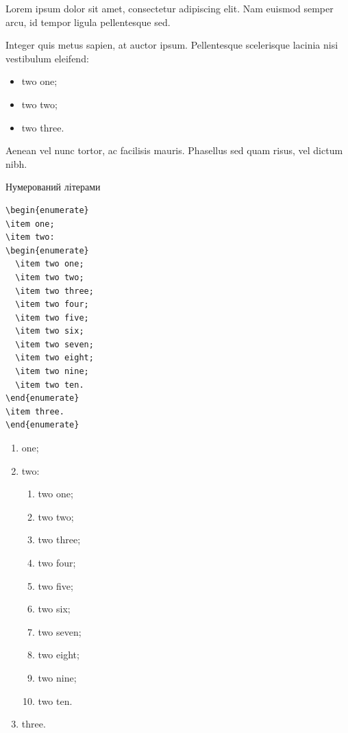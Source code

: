 \begin{longEnumerate}
\item Lorem ipsum dolor sit amet, consectetur adipiscing elit. Nam euismod semper arcu, id tempor ligula pellentesque sed. 
\item Integer quis metus sapien, at auctor ipsum. Pellentesque scelerisque
lacinia nisi vestibulum eleifend:
\begin{itemize}
  \item two one;
  \item two two;
  \item two three.
\end{itemize}
\item Aenean vel nunc tortor, ac facilisis mauris. Phasellus sed quam risus, vel dictum nibh.
\end{longEnumerate}

Нумерований літерами

\begin{framed}\small
\begin{lstlisting}
\begin{enumerate}
\item one;
\item two:
\begin{enumerate}
  \item two one;
  \item two two;
  \item two three;
  \item two four;
  \item two five;
  \item two six;
  \item two seven;
  \item two eight;
  \item two nine;
  \item two ten.
\end{enumerate}
\item three.
\end{enumerate}
\end{lstlisting}
\end{framed}

\begin{enumerate}
\item one;
\item two:
\begin{enumerate}
  \item two one;
  \item two two;
  \item two three;
  \item two four;
  \item two five;
  \item two six;
  \item two seven;
  \item two eight;
  \item two nine;
  \item two ten.
\end{enumerate}
\item three.
\end{enumerate}

